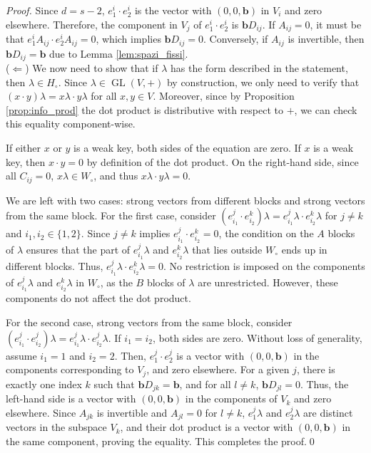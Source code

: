 \documentclass[10pt,a4paper]{amsart}
\DeclareMathOperator{\gl}{GL}
\newcommand{\ho}{H_\circ}
\newcommand{\wo}{W_\circ}
\renewcommand{\b}{\textbf{b}}
\begin{document}
\begin{proof}
Since \( d = s-2 \), \( e^i_1 \cdot e^i_2 \) is the vector with \((0, 0, \b)\) in \( V_i \) and zero elsewhere. Therefore, the component in \( V_j \) of \( e^i_1 \cdot e^i_2 \) is \( \b D_{ij} \). If \( A_{ij} = 0 \), it must be that \( e^i_1 A_{ij} \cdot e^i_2 A_{ij} = 0 \), which implies \( \b D_{ij} = 0 \). Conversely, if \( A_{ij} \) is invertible, then \( \b D_{ij} = \b \) due to Lemma \ref{lem:spazi_fissi}.\\


\noindent(\(\Leftarrow\)) We now need to show that if \( \lambda \) has the form described in the statement, then \( \lambda \in \ho\). Since \( \lambda \in \gl(V,+) \) by construction, we only need to verify that \( (x \cdot y)\lambda = x\lambda \cdot y\lambda \) for all \( x, y \in V \). Moreover, since by Proposition \ref{prop:info_prod} the dot product is distributive with respect to \( + \), we can check this equality component-wise.

If either \( x \) or \( y \) is a weak key, both sides of the equation are zero. If \( x \) is a weak key, then \( x \cdot y = 0 \) by definition of the dot product. On the right-hand side, since all \( C_{ij} = 0 \), \( x\lambda \in \wo \), and thus \( x\lambda \cdot y\lambda = 0 \).

We are left with two cases: strong vectors from different blocks and strong vectors from the same block. For the first case, consider \( (e^j_{i_1} \cdot e^k_{i_2})\lambda = e^j_{i_1} \lambda \cdot e^k_{i_2} \lambda \) for \( j \neq k \) and \( i_1, i_2 \in \{1, 2\} \). Since \( j \neq k \) implies \( e^j_{i_1} \cdot e^k_{i_2} = 0 \), the condition on the \( A \) blocks of \( \lambda \) ensures that the part of \( e^j_{i_1} \lambda \) and \( e^k_{i_2}\lambda \) that lies outside \( \wo \) ends up in different blocks. Thus, \( e^j_{i_1} \lambda \cdot e^k_{i_2}\lambda = 0 \). No restriction is imposed on the components of \( e^j_{i_1} \lambda \) and \( e^k_{i_2}\lambda \) in \( \wo \), as the \( B \) blocks of \( \lambda \) are unrestricted. However, these components do not affect the dot product.

For the second case, strong vectors from the same block, consider \( (e^j_{i_1} \cdot e^j_{i_2})\lambda = e^j_{i_1} \lambda \cdot e^j_{i_2} \lambda \). If \( i_1 = i_2 \), both sides are zero. Without loss of generality, assume \( i_1 = 1 \) and \( i_2 = 2 \). Then, \( e_1^j \cdot e_2^j \) is a vector with \( (0, 0, \b) \) in the components corresponding to \( V_j \), and zero elsewhere. For a given \( j \), there is exactly one index \( k \) such that \( \b D_{jk} = \b \), and for all \( l \neq k \), \( \b D_{jl} = 0 \). Thus, the left-hand side is a vector with \( (0, 0, \b) \) in the components of \( V_k \) and zero elsewhere. Since \( A_{jk} \) is invertible and \( A_{jl} = 0 \) for \( l \neq k \), \( e_1^j \lambda \) and \( e_2^j \lambda \) are distinct vectors in the subspace \( V_k \), and their dot product is a vector with \( (0, 0, \b) \) in the same component, proving the equality. This completes the proof.\qed

\end{proof}
\end{document}
